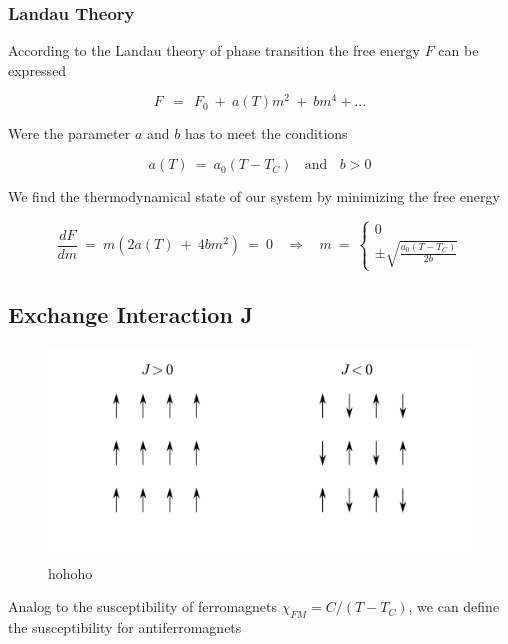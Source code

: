 \documentclass[10pt]{report}
\numberwithin{equation}{chapter}
\begin{document}
\subsubsection{Landau Theory}

According to the Landau theory of phase transition the free energy $F$ can be expressed

\begin{equation} \label{eq:ferromag_landau}
  F ~~=~~ F_0 ~+~ a(T) m^2 ~+~ b m^4 + ... 
\end{equation}

Were the parameter $a$ and $b$ has to meet the conditions

\begin{equation} \label{eq:ferromag_landau_condition}
  a(T) ~=~ a_0(T-T_C) ~~~~ \text{and} ~~~~ b>0
\end{equation}

We find the thermodynamical state of our system by minimizing the free energy

\begin{equation}
  \frac{dF}{dm} ~=~ m ( 2a(T) ~+~ 4bm^2) ~=~ 0 ~~~~ \Rightarrow ~~~~ m ~=~ \left\{ 
  \begin{array}{c}
    0\\
    \pm \sqrt{\frac{a_0(T-T_C)}{2b}}
  \end{array}
  \right.
\end{equation}



\subsection{Exchange Interaction J}


\begin{figure}
  \centering
  \includegraphics[width=0.7\linewidth]{../img/exch_spin_config.pdf}
  \caption{hohoho}
\end{figure}


Analog to the susceptibility of ferromagnets $\chi_{FM} = C/(T-T_C)$, we can define the susceptibility for antiferromagnets
\end{document}
